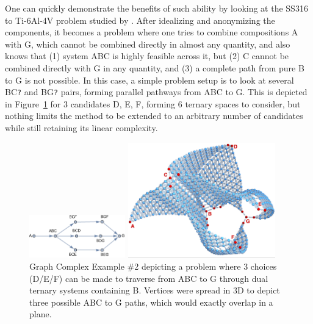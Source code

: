One can quickly demonstrate the benefits of such ability by looking at the SS316 to Ti-6Al-4V problem studied by \citet{Bobbio2022DesignCompositions}. After idealizing and anonymizing the components, it becomes a problem where one tries to combine compositions A with G, which cannot be combined directly in almost any quantity, and also knows that (1) system ABC is highly feasible across it, but (2) C cannot be combined directly with G in any quantity, and (3) a complete path from pure B to G is not possible. In this case, a simple problem setup is to look at several BC\texttt{?} and BG\texttt{?} pairs, forming parallel pathways from ABC to G. This is depicted in Figure~\ref{nimplex:fig:graphcomplex2} for 3 candidates D, E, F, forming 6 ternary spaces to consider, but nothing limits the method to be extended to an arbitrary number of candidates while still retaining its linear complexity.

\begin{figure}[h]
    \centering
    \begin{adjustbox}{valign=c}
        \includegraphics[width=0.37\textwidth]{nimplex/GraphComplexMap2.png}
    \end{adjustbox}
    \hspace{6pt}
    \begin{adjustbox}{valign=c}
        \includegraphics[width=0.57\textwidth]{nimplex/GraphComplex2.jpeg}
    \end{adjustbox}
    \caption{Graph Complex Example \#2 depicting a problem where 3 choices (D/E/F) can be made to traverse from ABC to G through dual ternary systems containing B. Vertices were spread in 3D to depict three possible ABC to G paths, which would exactly overlap in a plane.} 
    \label{nimplex:fig:graphcomplex2}
\end{figure}

